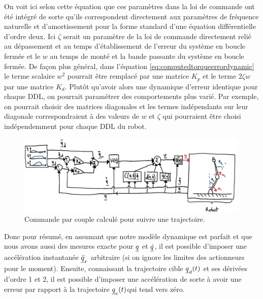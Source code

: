 On voit ici selon cette équation que ces paramètres dans la loi de commande ont été intégré de sorte qu'ils correspondent directement aux paramètres de fréquence naturelle et d'amortissement pour la forme standard d'une équation différentielle d'ordre deux. Ici $\zeta$ serait un paramètre de la loi de commande directement relié au dépassement et au temps d'établissement de l'erreur du système en boucle fermée et le $w$ au temps de monté et la bande passante du système en boucle fermée. De façon plus général, dans l'équation \eqref{eq:computedtorqueerrordynamic} le terme scalaire $w^2$ pourrait être remplacé par une matrice $K_p$ et le terme $2 \zeta w $ par une matrice $K_d$. Plutôt qu'avoir alors une dynamique d'erreur identique pour chaque DDL, on pourrait paramétrer des comportements plus varié. Par exemple, on pourrait choisir des matrices diagonales et les termes indépendants sur leur diagonale correspondraient à des valeurs de $w$ et $\zeta$ qui pourraient être choisi indépendemment pour chaque DDL du robot.
\begin{figure}[htp]
	\centering
		\includegraphics[width=0.99\textwidth]{fig/computedtorquetraj.jpg}
	\caption{Commande par couple calculé pour suivre une trajectoire.}
	\label{fig:computedtorquetraj}
\end{figure}

Donc pour résumé, en assumant que notre modèle dynamique est parfait et que nous avons aussi des mesures exacte pour $\underline{q}$ et $\underline{\dot{q}}$, il est possible d'imposer une accélération instantanée $\underline{\ddot{q}}_r$ arbitraire (si on ignore les limites des actionneurs pour le moment). Ensuite, connaissant la trajectoire cible $\underline{q}_d(t)$ et ses dérivées d'ordre 1 et 2, il est possible d'imposer une accélération de sorte à avoir une erreur par rapport à la trajectoire $\underline{q}_e(t)$qui tend vers zéro.







